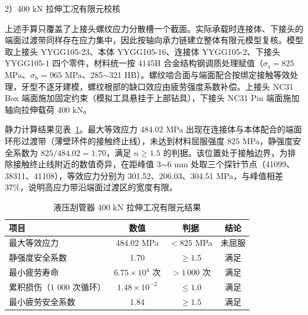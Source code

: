 2）400 kN 拉伸工况有限元校核

上述手算只覆盖了上接头螺纹应力分散槽一个截面。实际承载时连接体、下接头的端面过渡带同样存在应力集中，因此按轴向承力链建立整体有限元模型复核。模型取上接头 YYGG105-23、本体 YYGG105-16、连接体 YYGG105-2、下接头 YYGG105-1 四个零件，材料统一按 4145H 合金结构钢调质处理赋值（$\sigma_{\mathrm{s}} = 825$ MPa、$\sigma_{\mathrm{b}} = 965$ MPa、285$\sim$321 HB）。螺纹啮合面与端面配合按绑定接触等效处理，牙型不逐牙建模，螺纹根部的缺口效应由疲劳强度系数补偿。上接头 NC31 Box 端面施加固定约束（模拟工具悬挂于上部钻具），下接头 NC31 Pin 端面施加轴向拉伸载荷 400 kN。

静力计算结果见表~\ref{tab:hydraulic_fea_tension}。最大等效应力 484.02 MPa 出现在连接体与本体配合的端面环形过渡带（薄壁环件的接触终止线），未达到材料屈服强度 825 MPa，静强度安全系数为 $825/484.02 = 1.70$，满足 $n \ge 1.5$ 的判据。该位置处于接触边界，为排除接触终止线附近的数值奇异，在距峰值 3$\sim$6 mm 处取三个探针节点（41099、38311、41108），等效应力分别为 301.52、206.03、304.51 MPa，与峰值相差 37\%，说明高应力带沿端面过渡区的宽度有限。

\begin{table}[htbp]
    \centering
    \caption{液压刮管器 400 kN 拉伸工况有限元结果}
    \label{tab:hydraulic_fea_tension}
    \renewcommand{\arraystretch}{1.3}
    \begin{tabular}{lccc}
        \toprule
        项目 & 数值 & 判据 & 结论 \\
        \midrule
        最大等效应力 & 484.02 MPa & $< 825$ MPa & 未屈服 \\
        静强度安全系数 & 1.70 & $\ge 1.5$ & 满足 \\
        最小疲劳寿命 & $6.75 \times 10^{4}$ 次 & $> 1\,000$ 次 & 满足 \\
        累积损伤（1 000 次循环） & $1.48 \times 10^{-2}$ & $\le 1.0$ & 满足 \\
        最小疲劳安全系数 & 1.84 & $\ge 1.5$ & 满足 \\
        \bottomrule
    \end{tabular}
\end{table}

